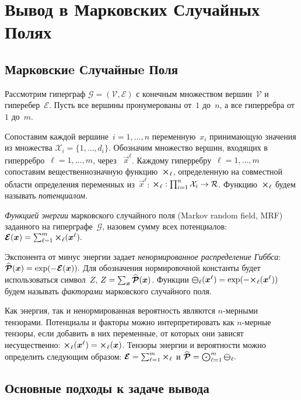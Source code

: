 \chapter{Вывод в Марковских Случайных Полях} \label{chap:mrf}
\section{Марковскиe Случайныe Поля} \label{sec:mrf}

Рассмотрим гиперграф $\mathcal{G} = (\mathcal{V}, \mathcal{E})$ с конечным множеством вершин~$\mathcal{V}$ и гиперебер~$\mathcal{E}$.
Пусть все вершины пронумерованы от~$1$ до~$n$, а все гиперребра от~$1$ до~$m$.

Сопоставим каждой вершине~$i = 1,\ldots,n$ переменную~$x_i$ принимающую значения из множества $\mathcal{X}_i = \{1,\dots,d_i\}$.
Обозначим множество вершин, входящих в гиперребро~$\ell = 1, \ldots, m$, через ~$\vec{x}^\ell$.
Каждому гиперребру~$\ell = 1, \ldots, m$ сопоставим вещественнозначную функцию~$\boldsymbol{\mathcal{\Theta}}_\ell$, определенную на совместной области определения переменных из~$\vec{x}^\ell$: $\boldsymbol{\mathcal{\Theta}}_\ell: \prod_{i=1}^n \mathcal{X}_i \to \mathcal{R}$. Функцию~$\boldsymbol{\mathcal{\Theta}}_\ell$ будем называть \emph{потенциалом}.

\emph{Функцией энергии} марковского случайного поля (Markov random field, MRF) заданного на гиперграфе~$\mathcal{G}$, назовем сумму всех потенциалов:
$
\boldsymbol{\mathcal{E}}(\boldsymbol{x}) = \sum_{\ell = 1}^{m} \boldsymbol{\mathcal{\Theta}}_\ell(\boldsymbol{x}^{\ell}).
$

Экспонента от минус энергии задает \emph{ненормированное распределение Гиббса}:
$
\widehat{\boldsymbol{\mathcal{P}}}(\boldsymbol{x}) = \exp(-\boldsymbol{\mathcal{E}}(\boldsymbol{x})).
$
Для обозначения нормировочной константы будет использоваться символ~$Z$, $Z = \sum_{\boldsymbol{x}} \widehat{\boldsymbol{\mathcal{P}}}(\boldsymbol{x})$. Функции $\boldsymbol{\mathcal{\Psi}}_\ell(\boldsymbol{x}^\ell) = \exp(-\boldsymbol{\mathcal{\Theta}}_\ell(\boldsymbol{x}^{\ell}))$ будем называть \emph{факторами} марковского случайного поля.

Как энергия, так и ненормированная вероятность являются $n$-мерными тензорами. Потенциалы и факторы можно интерпретировать как $n$-мерные тензоры, если добавить в них переменные, от которых они зависят несущественно: $\boldsymbol{\mathcal{\Theta}}_\ell (\boldsymbol{x}^\ell) = \boldsymbol{\mathcal{\Theta}}_\ell (\boldsymbol{x})$. Тензоры энергии и вероятности можно определить следующим образом:
$
\boldsymbol{\mathcal{E}} = \sum_{\ell = 1}^m \boldsymbol{\mathcal{\Theta}}_\ell
$
и
$
\widehat{\boldsymbol{\mathcal{P}}} =   \bigodot_{\ell = 1}^m \boldsymbol{\mathcal{\Psi}}_\ell.
$
\section{Основные подходы к задаче вывода} \label{sec:mrf-approaches}

